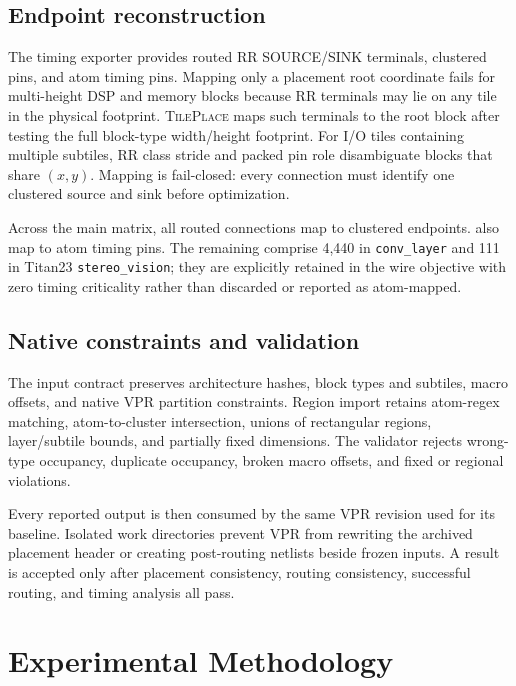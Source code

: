 \documentclass[sigconf,anonymous,review]{acmart}
\newcommand{\system}{\textsc{TilePlace}}
\newcommand{\vpr}{\textsc{VPR}}
\begin{document}
\subsection{Endpoint reconstruction}

The timing exporter provides routed RR SOURCE/SINK terminals, clustered pins,
and atom timing pins.  Mapping only a placement root coordinate fails for
multi-height DSP and memory blocks because RR terminals may lie on any tile in
the physical footprint.  \system{} maps such terminals to the root block after
testing the full block-type width/height footprint.  For I/O tiles containing
multiple subtiles, RR class stride and packed pin role disambiguate blocks that
share $(x,y)$.  Mapping is fail-closed: every connection must identify one
clustered source and sink before optimization.

Across the main matrix, all \MappedConnections{} routed connections map to
clustered endpoints.  \MappedAtomPins{} also map to atom timing pins.  The
remaining \UnmappedAtomPins{} comprise 4,440 in \texttt{conv\_layer} and 111
in Titan23 \texttt{stereo\_vision}; they are explicitly retained in the wire
objective with zero timing criticality rather than discarded or reported as
atom-mapped.

\subsection{Native constraints and validation}

The input contract preserves architecture hashes, block types and subtiles,
macro offsets, and native \vpr{} partition constraints.  Region import retains
atom-regex matching, atom-to-cluster intersection, unions of rectangular
regions, layer/subtile bounds, and partially fixed dimensions.  The validator
rejects wrong-type occupancy, duplicate occupancy, broken macro offsets, and
fixed or regional violations.

Every reported output is then consumed by the same \vpr{} revision used for
its baseline.  Isolated work directories prevent \vpr{} from rewriting the
archived placement header or creating post-routing netlists beside frozen
inputs.  A result is accepted only after placement consistency, routing
consistency, successful routing, and timing analysis all pass.

\section{Experimental Methodology}
\end{document}
